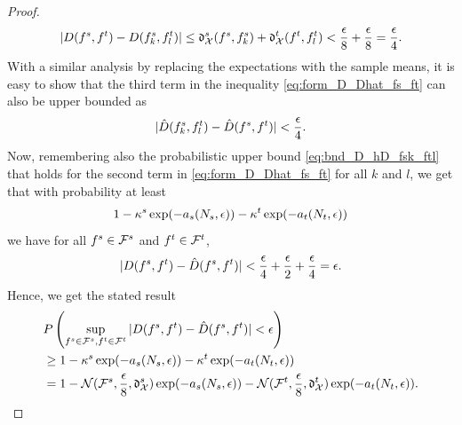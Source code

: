 \documentclass[review,supplement,onefignum,onetabnum]{siamonline250211}
\begin{document}
\begin{proof}
%
\begin{equation*}
\begin{split}
| D(f^s, f^t) - D(f^s_k, f^t_l) | 
\leq 
\mathfrak{d}^s_{\mathcal{X}} (f^s, f^s_k) +  \mathfrak{d}^t_{\mathcal{X}} (f^t, f^t_l)
< 
\frac{ \epsilon}{8} + \frac{ \epsilon}{8} = \frac{ \epsilon}{4}.
\end{split}
\end{equation*}
%
With a similar analysis by replacing the expectations with the sample means, it is easy to show that the third term in the inequality \eqref{eq:form_D_Dhat_fs_ft} can also be upper bounded as
%
\begin{equation*}
| \hat{D}(f^s_k, f^t_l) - \hat{D}(f^s, f^t) | < \frac{ \epsilon}{4}.
\end{equation*}
%
Now, remembering also the probabilistic upper bound \eqref{eq:bnd_D_hD_fsk_ftl} that holds for the second term in \eqref{eq:form_D_Dhat_fs_ft} for all $k$ and $l$, we get that with probability at least 
%
\begin{equation*}
1 - \kappa^s \exp(-a_s(N_s, \epsilon)) - \kappa^t \exp(-a_t(N_t, \epsilon))
\end{equation*}
%
we have for all $f^s \in \mathcal{F}^s$ and $f^t \in \mathcal{F}^t$,
%
\begin{equation*}
\begin{split}
| D(f^s, f^t) - \hat{D}(f^s, f^t) | < \frac{ \epsilon}{4} + \frac{ \epsilon}{2} + \frac{ \epsilon}{4}
= \epsilon.
\end{split}
\end{equation*}
%
Hence, we get the stated result
%
\begin{equation*}
\begin{split}
& P \left(
\sup_{f^s \in \mathcal{F}^s, f^t \in \mathcal{F}^t}  | D(f^s, f^t) - \hat{D} (f^s, f^t)  | < \epsilon
\right) \\
&\geq 1 - \kappa^s \exp(-a_s(N_s, \epsilon)) - \kappa^t \exp(-a_t(N_t, \epsilon))  \\
&= 1 - \mathcal{N}(\mathcal{F}^s, \frac{\epsilon}{8}, \mathfrak{d}^s_{\mathcal{X}} ) \exp(-a_s(N_s, \epsilon)) 
- \mathcal{N}(\mathcal{F}^t, \frac{\epsilon}{8}, \mathfrak{d}^t_{\mathcal{X}} ) \exp(-a_t(N_t, \epsilon)).
\end{split}
\end{equation*}
%
%
\end{proof}
    
\end{document}
